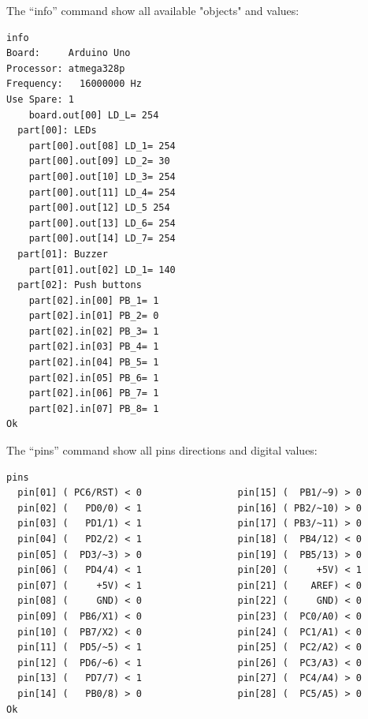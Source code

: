 The ``info'' command show all available "objects" and values:
\begin{verbatim}
info
Board:     Arduino Uno
Processor: atmega328p
Frequency:   16000000 Hz
Use Spare: 1
    board.out[00] LD_L= 254
  part[00]: LEDs
    part[00].out[08] LD_1= 254
    part[00].out[09] LD_2= 30
    part[00].out[10] LD_3= 254
    part[00].out[11] LD_4= 254
    part[00].out[12] LD_5 254
    part[00].out[13] LD_6= 254
    part[00].out[14] LD_7= 254
  part[01]: Buzzer
    part[01].out[02] LD_1= 140
  part[02]: Push buttons
    part[02].in[00] PB_1= 1
    part[02].in[01] PB_2= 0
    part[02].in[02] PB_3= 1
    part[02].in[03] PB_4= 1
    part[02].in[04] PB_5= 1
    part[02].in[05] PB_6= 1
    part[02].in[06] PB_7= 1
    part[02].in[07] PB_8= 1
Ok
\end{verbatim}

The ``pins'' command show all pins directions and digital values:
\begin{verbatim}
pins
  pin[01] ( PC6/RST) < 0                 pin[15] (  PB1/~9) > 0 
  pin[02] (   PD0/0) < 1                 pin[16] ( PB2/~10) > 0 
  pin[03] (   PD1/1) < 1                 pin[17] ( PB3/~11) > 0 
  pin[04] (   PD2/2) < 1                 pin[18] (  PB4/12) < 0 
  pin[05] (  PD3/~3) > 0                 pin[19] (  PB5/13) > 0 
  pin[06] (   PD4/4) < 1                 pin[20] (     +5V) < 1 
  pin[07] (     +5V) < 1                 pin[21] (    AREF) < 0 
  pin[08] (     GND) < 0                 pin[22] (     GND) < 0 
  pin[09] (  PB6/X1) < 0                 pin[23] (  PC0/A0) < 0 
  pin[10] (  PB7/X2) < 0                 pin[24] (  PC1/A1) < 0 
  pin[11] (  PD5/~5) < 1                 pin[25] (  PC2/A2) < 0 
  pin[12] (  PD6/~6) < 1                 pin[26] (  PC3/A3) < 0 
  pin[13] (   PD7/7) < 1                 pin[27] (  PC4/A4) > 0 
  pin[14] (   PB0/8) > 0                 pin[28] (  PC5/A5) > 0 
Ok
\end{verbatim}

